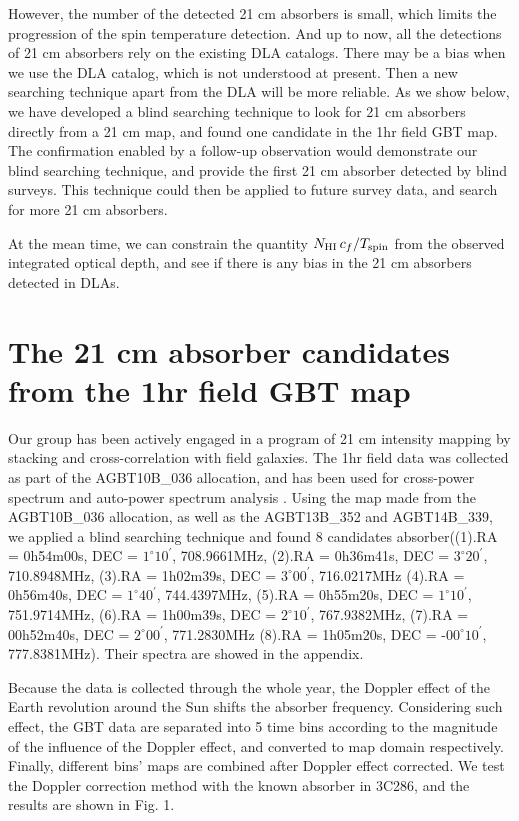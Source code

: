 \documentclass[prl,twocolumn,floatfix,superscriptaddress,nofootinbib,aps]{revtex4}
\begin{document}
However, the number of the detected 21 cm absorbers is small, which limits the progression of the spin temperature detection.
And up to now, all the detections of 21 cm absorbers rely on the existing DLA 
catalogs. There may be a bias when we use the DLA catalog, which is not understood at present. Then a new searching technique apart from the DLA will be more reliable. As we show below, we have developed a blind searching technique 
to look for 21 cm absorbers directly from a 21 cm map, 
and found one candidate in the 1hr field GBT map. The confirmation 
enabled by a follow-up observation would demonstrate our blind searching 
technique, and provide the first 21 cm absorber detected by blind surveys. 
This technique could then be applied to future survey data, and search for 
more 21 cm absorbers. 

At the mean time, we can constrain the quantity $N_{\rm HI}\,c_f/T_{\rm spin}$
from the observed integrated optical depth, and see if there is any bias 
in the 21 cm absorbers detected in DLAs.


\section{The 21 cm absorber candidates from the 1hr field GBT map}
Our group has been actively engaged in a program of 21 cm intensity mapping by 
stacking and cross-correlation with field galaxies. The 1hr field data was 
collected as part of the AGBT10B\_036 allocation, and has been used
for cross-power spectrum and auto-power spectrum analysis 
\cite{2013MNRAS.434L..46S, 2013ApJ...763L..20M}.
Using the map made from the AGBT10B\_036 allocation, as well as the
AGBT13B\_352 and AGBT14B\_339,
we applied a blind searching technique and found 8 candidates absorber((1).RA = 0h54m00s, DEC = $1^{\circ}10^\prime$, 708.9661MHz, (2).RA = 0h36m41s, DEC = $3^{\circ}20^\prime$, 710.8948MHz, (3).RA = 1h02m39s, DEC = $3^{\circ}00^\prime$, 716.0217MHz (4).RA = 0h56m40s, DEC = $1^{\circ}40^\prime$, 744.4397MHz, (5).RA = 0h55m20s, DEC = $1^{\circ}10^\prime$, 751.9714MHz, (6).RA = 1h00m39s, DEC = $2^{\circ}10^\prime$, 767.9382MHz, (7).RA = 00h52m40s, DEC = $2^{\circ}00^\prime$, 771.2830MHz (8).RA = 1h05m20s, DEC = -$00^{\circ}10^\prime$, 777.8381MHz). Their spectra are showed in the appendix.

Because the data is collected through the whole year, the Doppler effect
of the Earth revolution around the Sun shifts the absorber frequency.
Considering such effect, the GBT data are separated into 5 time bins 
according to the magnitude of the influence of the Doppler effect, and converted to map domain respectively. Finally, different bins' maps are combined after Doppler effect corrected. We test the Doppler correction method with the known absorber in 3C286, and the results are shown in Fig. 1.
\end{document}
